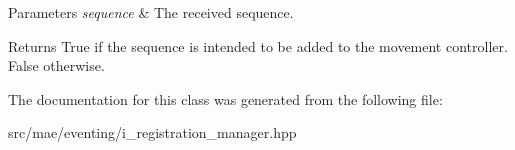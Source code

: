 \begin{DoxyParams}{Parameters}
{\em sequence} & The received sequence. \\
\hline
\end{DoxyParams}
\begin{DoxyReturn}{Returns}
True if the sequence is intended to be added to the movement controller. False otherwise. 
\end{DoxyReturn}


The documentation for this class was generated from the following file\-:\begin{DoxyCompactItemize}
\item 
src/mae/eventing/i\-\_\-registration\-\_\-manager.\-hpp\end{DoxyCompactItemize}
